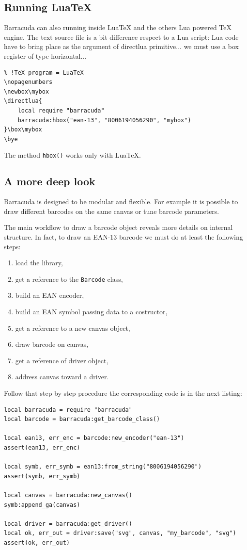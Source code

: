\documentclass[11pt]{article}
\newcommand{\code}[1]{\texttt{#1}}
\begin{document}
\subsection{Running Lua\TeX}

Barracuda can also running inside Lua\TeX{} and the others Lua powered \TeX{}
engine. The text source file is a bit difference respect to a Lua script: Lua
code have to bring place as the argument of directlua primitive... we must use
a box register of type horizontal...

\begin{Verbatim}
% !TeX program = LuaTeX
\nopagenumbers
\newbox\mybox
\directlua{
	local require "barracuda"
	barracuda:hbox("ean-13", "8006194056290", "mybox")
}\box\mybox
\bye
\end{Verbatim}

The method \code{hbox()} works only with Lua\TeX{}.


\subsection{A more deep look}

Barracuda is designed to be modular and flexible. For example it is possible
to draw different barcodes on the same canvas or tune barcode parameters. 

The main workflow to draw a barcode object reveals more details on internal
structure. In fact, to draw an EAN-13 barcode we must do at least the following
steps:
\begin{enumerate}
\item load the library,
\item get a reference to the \code{Barcode} class,
\item build an EAN encoder,
\item build an EAN symbol passing data to a costructor,
\item get a reference to a new canvas object,
\item draw barcode on canvas,
\item get a reference of driver object,
\item address canvas toward a driver.
\end{enumerate}

Follow that step by step procedure the corresponding code is in the next
listing:
\begin{Verbatim}
local barracuda = require "barracuda"
local barcode = barracuda:get_barcode_class()

local ean13, err_enc = barcode:new_encoder("ean-13")
assert(ean13, err_enc)

local symb, err_symb = ean13:from_string("8006194056290")
assert(symb, err_symb)

local canvas = barracuda:new_canvas()
symb:append_ga(canvas)

local driver = barracuda:get_driver()
local ok, err_out = driver:save("svg", canvas, "my_barcode", "svg")
assert(ok, err_out)
\end{Verbatim}
\end{document}
